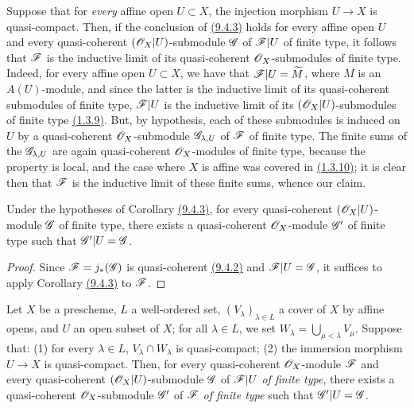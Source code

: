 \begin{rmk}[9.4.4]
\label{rmk-1.9.4.4}
Suppose that for {\em every} affine open $U\subset X$, the injection morphism $U\to X$ is
quasi-compact. Then, if the conclusion of \hyperref[cor-1.9.4.3]{(9.4.3)} holds for every affine open $U$
and every quasi-coherent $(\mathscr{O}_X|U)$-submodule $\mathscr{G}$ of $\mathscr{F}|U$ of finite type, it
follows
that $\mathscr{F}$ is the inductive limit of its quasi-coherent $\mathscr{O}_X$-submodules of finite type.
Indeed, for every affine open $U\subset X$, we have that $\mathscr{F}|U=\widetilde{M}$, where $M$
is an $A(U)$-module, and since the latter is the inductive limit of its quasi-coherent
submodules of finite type, $\mathscr{F}|U$ is the inductive limit of its $(\mathscr{O}_X|U)$-submodules of
finite type \hyperref[cor-1.1.3.9]{(1.3.9)}. But, by hypothesis, each of these submodules is induced on $U$
by a quasi-coherent $\mathscr{O}_X$-submodule $\mathscr{G}_{\lambda,U}$ of $\mathscr{F}$ of finite type. The
finite sums of the $\mathscr{G}_{\lambda,U}$ are again quasi-coherent $\mathscr{O}_X$-modules of finite
type, because the property is local, and the case where $X$ is affine was covered in
\hyperref[env-1.1.3.10]{(1.3.10)}; it is clear then that $\mathscr{F}$ is the inductive limit of these finite
sums, whence our claim.
\end{rmk}

\begin{cor}[9.4.5]
\label{cor-1.9.4.5}
Under the hypotheses of Corollary \hyperref[cor-1.9.4.3]{(9.4.3)}, for every quasi-coherent $(\mathscr{O}_X|U)$-module
$\mathscr{G}$ of finite type, there exists a quasi-coherent $\mathscr{O}_X$-module $\mathscr{G}'$ of finite
type such that $\mathscr{G}'|U=\mathscr{G}$.
\end{cor}

\begin{proof}
\label{proof-cor-1.9.4.5}
Since $\mathscr{F}=j_*(\mathscr{G})$ is quasi-coherent \hyperref[prop-1.9.4.2]{(9.4.2)} and $\mathscr{F}|U=\mathscr{G}$, it
suffices to apply Corollary \hyperref[cor-1.9.4.3]{(9.4.3)} to $\mathscr{F}$.
\end{proof}

\begin{lem}[9.4.6]
\label{lem-1.9.4.6}
Let $X$ be a prescheme, $L$ a well-ordered set, $(V_\lambda)_{\lambda\in L}$ a cover of $X$
by affine opens, and $U$ an open subset of $X$; for all $\lambda\in L$, we set
$W_\lambda=\bigcup_{\mu<\lambda}V_\mu$. Suppose that: (1) for every $\lambda\in L$,
$V_\lambda\cap W_\lambda$ is quasi-compact; (2) the immersion morphism $U\to X$ is
quasi-compact. Then, for every quasi-coherent $\mathscr{O}_X$-module $\mathscr{F}$ and every
quasi-coherent $(\mathscr{O}_X|U)$-submodule $\mathscr{G}$ of $\mathscr{F}|U$ {\em of finite type}, there
exists a quasi-coherent $\mathscr{O}_X$-submodule $\mathscr{G}'$ of $\mathscr{F}$ {\em of finite type} such
that $\mathscr{G}'|U=\mathscr{G}$.
\end{lem}

